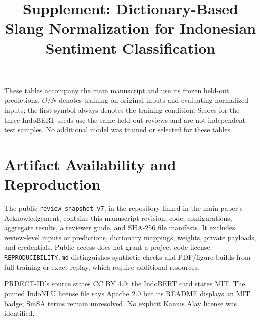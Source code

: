 \documentclass[conference]{IEEEtran}
\begin{document}
\title{Supplement: Dictionary-Based Slang Normalization for Indonesian Sentiment Classification}
\author{}
\maketitle
These tables accompany the main manuscript and use its frozen held-out predictions. $O/N$ denotes training on original inputs and evaluating normalized inputs; the first symbol always denotes the training condition. Scores for the three IndoBERT seeds use the same held-out reviews and are not independent test samples. No additional model was trained or selected for these tables.
\section*{Artifact Availability and Reproduction}
The public \texttt{review\_snapshot\_v7}, in the repository linked in the main paper's Acknowledgement, contains this manuscript revision, code, configurations, aggregate results, a reviewer guide, and SHA-256 file manifests. It excludes review-level inputs or predictions, dictionary mappings, weights, private payloads, and credentials. Public access does not grant a project code license. \texttt{REPRODUCIBILITY.md} distinguishes synthetic checks and PDF/figure builds from full training or exact replay, which require additional resources.

PRDECT-ID's source states CC BY 4.0; the IndoBERT card states MIT. The pinned IndoNLU license file says Apache 2.0 but its README displays an MIT badge; SmSA terms remain unresolved. No explicit Kamus Alay license was identified.
\end{document}

